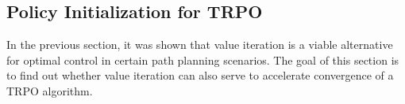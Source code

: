 %	
%	
%	
%	
%	

\FloatBarrier

\newpage
\subsection{Policy Initialization for TRPO}
\label{sec:dp_init_trpo}
In the previous section, it was shown that value iteration is a viable alternative for optimal control in certain path planning scenarios. The goal of this section is to find out whether value iteration can also serve to accelerate convergence of a TRPO algorithm.

